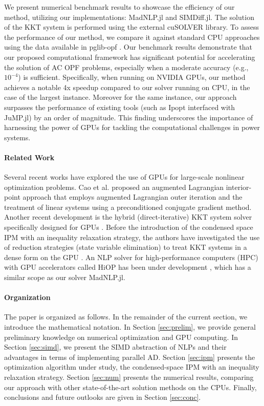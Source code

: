 We present numerical benchmark results to showcase the efficiency of
our method, utilizing our implementations: MadNLP.jl and
SIMDiff.jl. The solution of the KKT system is performed using the
external cuSOLVER library. To assess the performance of our method, we
compare it against standard CPU approaches using the data available in
pglib-opf \cite{wachter2006implementation}.  Our benchmark results
demonstrate that our proposed computational framework has significant
potential for accelerating the solution of AC OPF problems, especially
when a moderate accuracy (e.g., $10^{-4}$) is sufficient.
Specifically, when running on NVIDIA GPUs, our method achieves a
notable 4x speedup compared to our solver running on CPU, in the case
of the largest instance. Moreover for the same instance, our approach
surpasses the performance of existing tools (such as Ipopt interfaced
with JuMP.jl) by an order of magnitude.  This finding underscores the
importance of harnessing the power of GPUs for tackling
the computational challenges in power systems.

\paragraph*{Related Work}
Several recent works have explored the use of GPUs for large-scale
nonlinear optimization problems. Cao et al. \cite{cao2016augmented}
proposed an augmented Lagrangian interior-point approach that employs
augmented Lagrangian outer iteration and the treatment of linear
systems using a preconditioned conjugate gradient method.  Another
recent development is the hybrid (direct-iterative) KKT system solver
specifically designed for GPUs \cite{regev2023hykkt}.  Before the
introduction of the condensed space IPM with an inequality relaxation
strategy, the authors have investigated the use of reduction
strategies (state variable elimination) to treat KKT systems in a
dense form on the GPU
\cite{pacaud2023parallel,pacaud2022feasible,pacaud2023accelerating,cole2023exploiting}.
An NLP solver for high-performance computers (HPC) with GPU
accelerators called HiOP has been under development
\cite{hiop_techrep}, which has a similar scope as our solver
MadNLP.jl.

\paragraph*{Organization}
The paper is organized as follows. In the remainder of the current
section, we introduce the mathematical notation. In Section
\ref{sec:prelim}, we provide general preliminary knowledge on
numerical optimization and GPU computing. In Section \ref{sec:simd},
we present the SIMD abstraction of NLPs and their advantages in terms
of implementing parallel AD. Section \ref{sec:ipm} presents the
optimization algorithm under study, the condensed-space IPM with an
inequality relaxation strategy. Section \ref{sec:num} presents the
numerical results, comparing our approach with other state-of-the-art
solution methods on the CPUs. Finally, conclusions and future outlooks
are given in Section \ref{sec:conc}.

